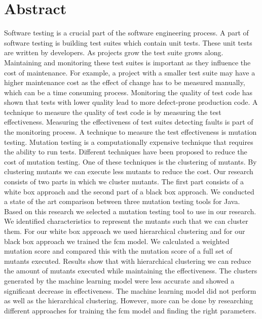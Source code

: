 \documentclass[../main]{subfiles}
\begin{document}
\chapter*{Abstract}
Software testing is a crucial part of the software engineering process. 
A part of software testing is building test suites which contain unit tests.
These unit tests are written by developers. 
As projects grow the test suite grows along.
Maintaining and monitoring these test suites is important as they influence the cost of maintenance.
For example, a project with a smaller test suite may have a higher maintenance cost as the effect of change has to be measured manually, which can be a time consuming process.
Monitoring the quality of test code has shown that tests with lower quality lead to more defect-prone production code.
A technique to measure the quality of test code is by measuring the test effectiveness.
\newline
Measuring the effectiveness of test suites detecting faults is part of the monitoring process.
A technique to measure the test effectiveness is mutation testing.
Mutation testing is a computationally expensive technique that requires the ability to run tests.
Different techniques have been proposed to reduce the cost of mutation testing.
One of these techniques is the clustering of mutants.
By clustering mutants we can execute less mutants to reduce the cost.
\newline
Our research consists of two parts in which we cluster mutants.
The first part consists of a white box approach and the second part of a black box approach.
We conducted a state of the art comparison between three mutation testing tools for Java.
Based on this research we selected a mutation testing tool to use in our research.
\newline
We identified characteristics to represent the mutants such that we can cluster them.
For our white box approach we used hierarchical clustering and for our black box approach we trained the \acrlong{fcm} model.
We calculated a weighted mutation score and compared this with the mutation score of a full set of mutants executed.
Results show that with hierarchical clustering we can reduce the amount of mutants executed while maintaining the effectiveness.
The clusters generated by the machine learning model were less accurate and showed a significant decrease in effectiveness.
The machine learning model did not perform as well as the hierarchical clustering.
However, more can be done by researching different approaches for training the \acrshort{fcm} model and finding the right parameters. 
\end{document}

